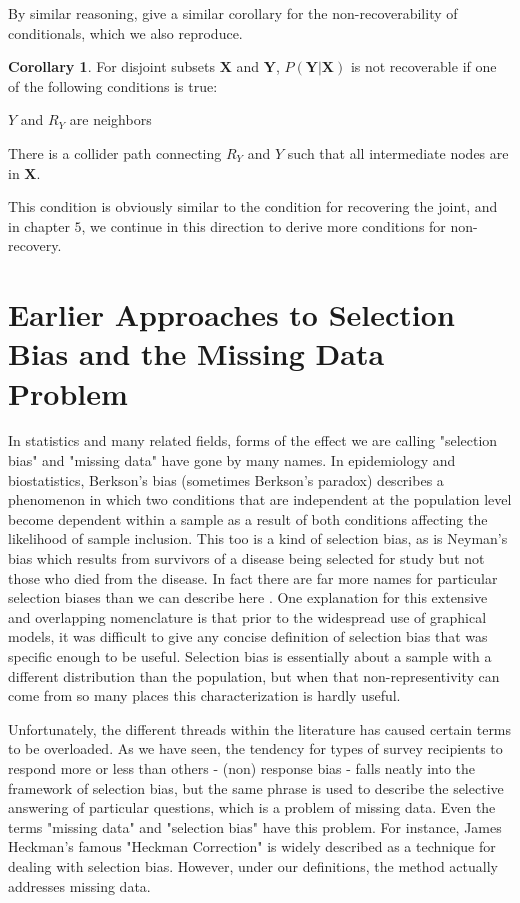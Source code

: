 \documentclass[12pt,twoside]{reedthesis}
\theoremstyle{definition}
\newtheorem{corollary}{Corollary}[section]
\begin{document}
By similar reasoning, \cite{Mohan_2014} give a similar corollary for the non-recoverability of conditionals, which we also reproduce.

\begin{corollary}
For disjoint subsets $\mathbf{X}$ and $\mathbf{Y}$,  $P(\mathbf{Y} | \mathbf{X})$ is not recoverable if one of the following conditions is true:
\item $Y$ and $R_Y$ are neighbors

\item There is a collider path connecting $R_Y$ and $Y$ such that all intermediate nodes are in $\mathbf{X}$.
\end{corollary}

This condition is obviously similar to the condition for recovering the joint, and in chapter $5$, we continue in this direction to derive more conditions for non-recovery.

\chapter{Earlier Approaches to Selection Bias and the Missing Data Problem}

In statistics and many related fields, forms of the effect we are calling "selection bias" and "missing data" have gone by many names.  In epidemiology and biostatistics, Berkson's bias (sometimes Berkson's paradox) describes a phenomenon in which two conditions that are independent at the population level become dependent within a sample as a result of both conditions affecting the likelihood of sample inclusion. This too is a kind of selection bias, as is Neyman's bias which results from survivors of a disease being selected for study but not those who died from the disease. In fact there are far more names for particular selection biases than we can describe here \citep{Delgado_2008}. One explanation for this extensive and overlapping nomenclature is that prior to the widespread use of graphical models, it was difficult to give any concise definition of selection bias that was specific enough to be useful. Selection bias is essentially about a sample with a different distribution than the population, but when that non-representivity can come from so many places this characterization is hardly useful.

Unfortunately, the different threads within the literature has caused certain terms to be overloaded. As we have seen, the tendency for types of survey recipients to respond more or less than others - (non) response bias - falls neatly into the framework of selection bias, but the same phrase is used to describe the selective answering of particular questions, which is a problem of missing data. Even the terms "missing data" and "selection bias" have this problem. For instance, James Heckman's famous "Heckman Correction"
 is widely described as a technique for dealing with selection bias. However, under our definitions, the method actually addresses missing data. 
 
\end{document}
